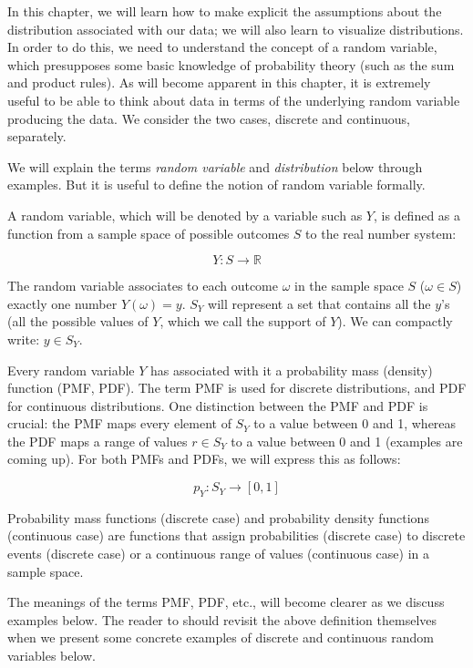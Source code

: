 \documentclass[
  12pt,
]{krantz}
\theoremstyle{definition}
\theoremstyle{definition}
\theoremstyle{definition}
\theoremstyle{definition}
\theoremstyle{remark}
\begin{document}
In this chapter, we will learn how to make explicit the assumptions about the distribution associated with our data; we will also learn to visualize distributions. In order to do this, we need to understand the concept of a random variable, which presupposes some basic knowledge of probability theory (such as the sum and product rules). As will become apparent in this chapter, it is extremely useful to be able to think about data in terms of the underlying random variable producing the data. We consider the two cases, discrete and continuous, separately.

We will explain the terms \emph{random variable} and \emph{distribution} below through examples. But it is useful to define the notion of random variable formally.

A random variable, which will be denoted by a variable such as \(Y\), is defined as a function from a sample space of possible outcomes \(S\) to the real number system:

\begin{equation}
Y : S \rightarrow \mathbb{R}
\end{equation}

The random variable associates to each outcome \(\omega\) in the sample space \(S\) (\(\omega \in S\)) exactly one number \(Y(\omega) = y\). \(S_Y\) will represent a set that contains all the \(y\)'s (all the possible values of \(Y\), which we call the support of \(Y\)). We can compactly write: \(y \in S_Y\).

Every random variable \(Y\) has associated with it a probability mass (density) function (PMF, PDF). The term PMF is used for discrete distributions, and PDF for continuous distributions. One distinction between the PMF and PDF is crucial: the PMF maps every element of \(S_Y\) to a value between 0 and 1, whereas the PDF maps a range of values \(r\in S_Y\) to a value between 0 and 1 (examples are coming up). For both PMFs and PDFs, we will express this as follows:

\begin{equation}
p_Y : S_Y \rightarrow [0, 1] 
\end{equation}

Probability mass functions (discrete case) and probability density functions (continuous case) are functions that assign probabilities (discrete case) to discrete events (discrete case) or a continuous range of values (continuous case) in a sample space.

The meanings of the terms PMF, PDF, etc., will become clearer as we discuss examples below. The reader to should revisit the above definition themselves when we present some concrete examples of discrete and continuous random variables below.
\end{document}
